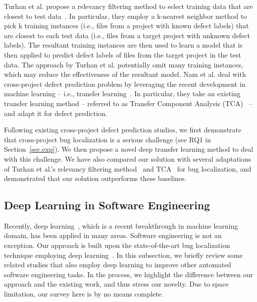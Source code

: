 Turhan et al. propose a relevancy filtering method to select training data that are closest to test data~\cite{TurhanMBS09}. In particular, they employ a k-nearest neighbor method to pick k training instances (i.e., files from a project with known defect labels) that are closest to each test data (i.e., files from a target project with unknown defect labels). The resultant training instances are then used to learn a model that is then applied to predict defect labels of files from the target project in the test data. The approach by Turhan et al. potentially omit many training instances, which may reduce the effectiveness of the resultant model. Nam et al. deal with cross-project defect prediction problem by leveraging the recent development in machine learning -- i.e., transfer learning~\cite{NamPK13}. In particular, they take an existing transfer learning method -- referred to as Transfer Component Analysis (TCA)~\cite{PanTKY11} -- and adapt it for defect prediction.

Following existing cross-project defect prediction studies, we first demonstrate that cross-project bug localization is a serious challenge (see RQ1 in Section~\ref{sec.exp}). We then propose a novel deep transfer learning method to deal with this challenge. We have also compared our solution with several adaptations of Turhan et al.'s relevancy filtering method~\cite{TurhanMBS09} and TCA~\cite{PanTKY11} for bug localization, and demonstrated that our solution outperforms these baselines.


\subsection{Deep Learning in Software Engineering}\label{sec.deeplearning}

Recently, deep learning~\cite{Goodfellow-et-al-2016}, which is a recent breakthrough in machine learning domain, has been applied in many areas. Software engineering is not an exception. Our approach is built upon the state-of-the-art bug localization technique employing deep learning~\cite{huo2016learning}. In this subsection, we briefly review some related studies that also employ deep learning to improve other automated software engineering tasks. In the process, we highlight the difference between our approach and the existing work, and thus stress our novelty. Due to space limitation, our survey here is by no means complete.

